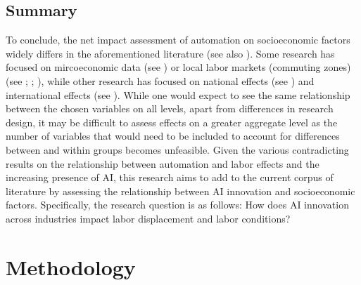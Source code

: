 \documentclass[
  12pt,
  a4paperpaper,
]{article}
\begin{document}
\subsection{Summary}\label{sec-summary-of-effects}

To conclude, the net impact assessment of automation on socioeconomic
factors widely differs in the aforementioned literature (see also
). Some
research has focused on mircoeconomic data (see
) or local labor
markets (commuting zones) (see
;
;
), while other
research has focused on national effects (see
) and
international effects (see ). While one would expect to see the same relationship
between the chosen variables on all levels, apart from differences in
research design, it may be difficult to assess effects on a greater
aggregate level as the number of variables that would need to be
included to account for differences between and within groups becomes
unfeasible. Given the various contradicting results on the relationship
between automation and labor effects and the increasing presence of AI,
this research aims to add to the current corpus of literature by
assessing the relationship between AI innovation and socioeconomic
factors. Specifically, the research question is as follows: How does AI
innovation across industries impact labor displacement and labor
conditions?

\section{Methodology}\label{sec-methodology}
\end{document}

